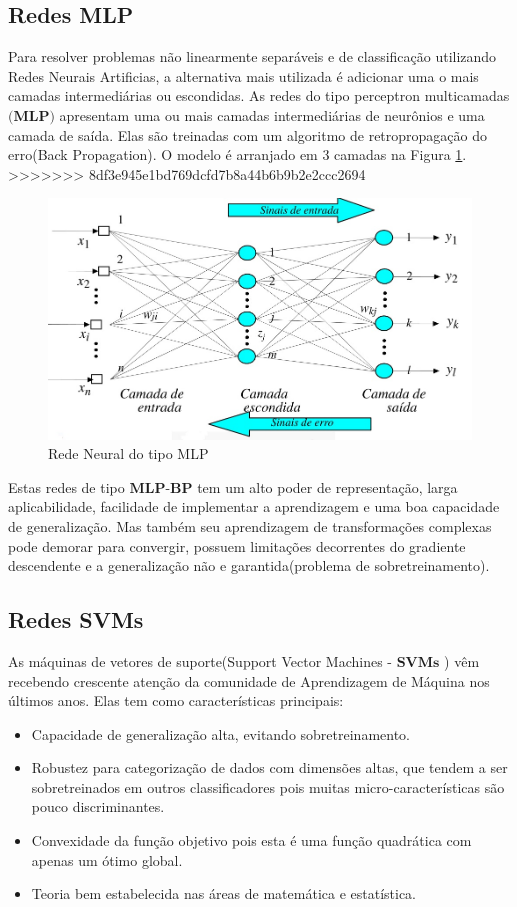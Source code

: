 \documentclass[12pt]{article}
\begin{document}
\subsection{Redes MLP}
Para resolver problemas não linearmente separáveis e de classificação utilizando Redes Neurais Artificias, a alternativa mais utilizada é adicionar uma o mais camadas intermediárias ou escondidas. As redes do tipo perceptron multicamadas $\textbf{(MLP)}$ apresentam uma ou mais camadas intermediárias de neurônios e uma camada de saída. Elas são treinadas com um algoritmo de retropropagação do erro(Back Propagation).
O modelo é arranjado em 3 camadas na Figura \ref{fig:mlp}.
>>>>>>> 8df3e945e1bd769dcfd7b8a44b6b9b2e2ccc2694
\begin{figure}[h]
\centering
\includegraphics[width=4.5in]{../out/mlp.jpg}
\caption{Rede Neural do tipo MLP}
\label{fig:mlp}
\end{figure} 

Estas redes de tipo $\textbf{MLP-BP}$ tem um alto poder de representação, larga aplicabilidade, facilidade de implementar a aprendizagem e uma boa capacidade de generalização. Mas também seu aprendizagem de transformações complexas pode demorar para convergir, possuem limitações decorrentes do gradiente descendente e a generalização não e garantida(problema de sobretreinamento).

\subsection{Redes SVMs}

As máquinas de vetores de suporte(Support Vector Machines - $\textbf{SVMs}$ ) vêm recebendo crescente atenção da comunidade de Aprendizagem de Máquina nos últimos anos. Elas tem como características principais:
\begin{itemize}
    \item Capacidade de generalização alta, evitando sobretreinamento.
    \item Robustez para categorização de dados com dimensões altas, que tendem a ser sobretreinados em outros classificadores pois muitas micro-características são pouco discriminantes.
    \item Convexidade da função objetivo pois esta é uma função quadrática com apenas um ótimo global. 
    \item Teoria bem estabelecida nas áreas de matemática e estatística.
\end{itemize}
\end{document}

